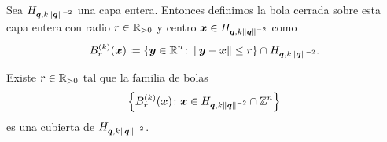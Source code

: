 Sea $H_{\boldsymbol{q}, k\left\lVert \boldsymbol{q} \right\rVert^{-2}}$ una capa entera. Entonces definimos la bola cerrada sobre
esta capa entera con radio $r \in \mathbb{R}_{>0}$ y centro $\boldsymbol{x} \in H_{\boldsymbol{q}, k\left\lVert \boldsymbol{q} \right\rVert^{-2}}$ como
\begin{equation}
	\label{eq:k-ball}
	B_r^{(k)}(\boldsymbol{x}) \coloneq \lbrace \boldsymbol{y} \in \mathbb{R}^n \colon \left\lVert \boldsymbol{y} - \boldsymbol{x} \right\rVert \leq r
	\rbrace \cap H_{\boldsymbol{q}, k \left\lVert \boldsymbol{q} \right\rVert^{-2}}.
\end{equation}
\begin{lemma}
	\label{lemma:ball-cover}
	Existe $r \in \mathbb{R}_{>0}$ tal que la familia de bolas
	\begin{equation*}
		\left\lbrace B_r^{(k)}(\boldsymbol{x}) \colon \boldsymbol{x} \in H_{\boldsymbol{q}, k\left\lVert \boldsymbol{q} \right\rVert^{-2}} \cap
			\mathbb{Z}^n \right\rbrace
	\end{equation*}
	es una cubierta de $H_{\boldsymbol{q}, k\left\lVert \boldsymbol{q} \right\rVert^{-2}}$.
\end{lemma}
